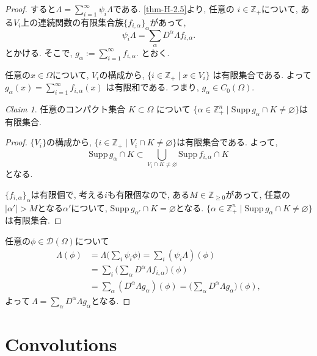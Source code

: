 \documentclass[dvipdfmx,a4paper,11pt]{article} %
\theoremstyle{definition}
\theoremstyle{remark}
\newtheorem{claim}[thm]{Claim}
\numberwithin{equation}{section}
\newcommand{\N}{\mathbb{Z}_+}
\begin{document}
\begin{proof}
すると\(\Lambda = \sum_{i=1}^\infty \psi_i \Lambda\)である. \ref{thm-H-2.5}より, 任意の \( i \in \N\)について, ある$V_i$上の連続関数の有限集合族\(\{ f_{i,\alpha} \}_\alpha\)があって, 
\[
\psi_i \Lambda = \sum_\alpha D^\alpha \Lambda f_{i,\alpha}.
\]
とかける. そこで, 
\(
g_\alpha := \sum_{i=1}^\infty f_{i,\alpha}.
\)
とおく. 

任意の\( x \in \Omega\)について,  \(V_i\)の構成から, \(\{ i \in \N \mid x \in V_i  \}\)
は有限集合である. よって\(g_\alpha(x) = \sum_{i=1}^\infty f_{i,\alpha}(x)\) は有限和である. 
つまり, \( g_\alpha \in C_0(\Omega)\).

\begin{tcolorbox}[mybox]
\begin{claim}
任意のコンパクト集合 \(K \subset \Omega\) について
 \(\{ \alpha \in \N^n \mid \mathrm{Supp}\,g_\alpha \cap K \neq \varnothing \}\)は有限集合.
\end{claim}
\end{tcolorbox}
\begin{proof}
 \(\{V_i\}\)の構成から,  \(\{ i \in \N\mid V_i \cap K \neq \varnothing \}\)は有限集合である.
よって, 
\[ \mathrm{Supp}\, g_\alpha \cap K \subset \bigcup_{V_i \cap K \neq \varnothing} \mathrm{Supp}\, f_{i,\alpha} \cap K\]
となる. 

\(\{ f_{i,\alpha} \}_\alpha\)は有限個で, 考える$i$も有限個なので, 
ある\( M \in \mathbb{Z}_{\geq 0}\)があって, 
任意の\(|\alpha'| > M\)となる\(\alpha'\)について,  \(\mathrm{Supp}\, g_{\alpha'} \cap K = \varnothing\)となる. 
\(\{ \alpha \in \N^n \mid \mathrm{Supp}\, g_\alpha \cap K \neq \varnothing \}\)は有限集合. 
\end{proof}


任意の\(\phi \in \mathcal{D}(\Omega)\)について
\begin{align*}
\Lambda(\phi) &= \Lambda\big(\sum_i \psi_i \phi\big) 
= \sum_i (\psi_i \Lambda)(\phi) \\
&= \sum_i \big(\sum_\alpha D^\alpha \Lambda f_{i,\alpha}\big)(\phi) \\
&= \sum_\alpha (D^\alpha \Lambda g_\alpha)(\phi) = \big(\sum_\alpha D^\alpha \Lambda g_\alpha\big)(\phi),
\end{align*}
よって\(\ \Lambda = \sum_\alpha D^\alpha \Lambda g_\alpha\)となる. 
\end{proof}

\section{Convolutions}
\end{document}
